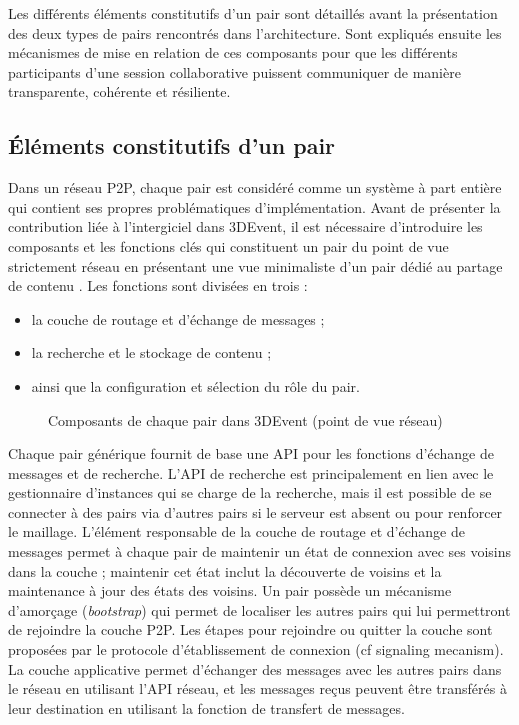 Les différents éléments constitutifs d'un pair sont détaillés avant la présentation 
des deux types de pairs rencontrés dans l'architecture.
Sont expliqués ensuite les mécanismes de mise en relation de 
ces composants pour que les différents participants d'une session 
collaborative puissent communiquer de manière transparente, cohérente et 
résiliente.



\subsection{Éléments constitutifs d'un pair}
Dans un réseau \gls{P2P}, chaque pair est considéré comme un système à part 
entière qui contient ses propres problématiques d'implémentation. Avant de 
présenter la contribution liée à l'intergiciel dans 3DEvent, il est nécessaire 
d'introduire les composants et les fonctions clés qui constituent un pair du point de 
vue strictement réseau en 
présentant une vue minimaliste d'un pair dédié au partage de contenu 
\cite[p.135-136]{Buford2009}. Les 
fonctions sont divisées en trois :
\begin{itemize}
	\item la couche de routage et d'échange de messages ;
	\item la recherche et le stockage de contenu ;
	\item ainsi que la configuration et sélection du rôle du pair.
\end{itemize}


\begin{figure}[ht]
	\centering
	\caption{Composants de chaque pair dans 3DEvent (point de vue réseau)}
	\label{fig:middleware}
\end{figure}


Chaque pair générique fournit de base une \gls{API} pour les fonctions d'échange 
de messages et de recherche. 
L'\gls{API} de recherche est principalement en lien avec le 
gestionnaire d'instances qui se charge de la recherche, mais il est possible de se 
connecter à des pairs via d'autres pairs si le serveur est absent ou pour renforcer 
le maillage.
L'élément responsable de la couche de routage et d'échange de messages permet 
à chaque pair de maintenir un état de connexion avec ses voisins dans la couche 
; maintenir cet état inclut la découverte de voisins et la maintenance  à jour des 
états des voisins.
Un pair possède un mécanisme d'amorçage (\textit{bootstrap}) qui permet de 
localiser les autres pairs qui lui permettront de rejoindre la couche \gls{P2P}. Les 
étapes pour rejoindre ou quitter la couche sont proposées par le protocole 
d'établissement de connexion 
(cf signaling mecanism).
La couche applicative permet d'échanger des messages avec les autres pairs 
dans le réseau en utilisant l'\gls{API} réseau, et les messages reçus peuvent être 
transférés à leur destination en utilisant la fonction de transfert de messages. 

